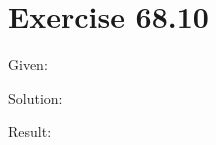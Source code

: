 \documentclass[a4paper, 10pt]{scrartcl}
\begin{document}
\section{Exercise 68.10}

Given:

Solution:

Result:
\end{document}
